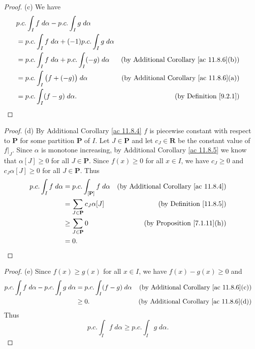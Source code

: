 \begin{proof}{(c)}
    We have
    \begin{align*}
         & p.c. \int_I f \; d \alpha - p.c. \int_I g \; d \alpha                                                              \\
         & = p.c. \int_I f \; d \alpha + (-1) p.c. \int_I g \; d \alpha                                                       \\
         & = p.c. \int_I f \; d \alpha + p.c. \int_I (-g) \; d \alpha   & \text{(by Additional Corollary \ref{ac 11.8.6}(b))} \\
         & = p.c. \int_I \big(f + (-g)\big) \; d \alpha                 & \text{(by Additional Corollary \ref{ac 11.8.6}(a))} \\
         & = p.c. \int_I (f - g) \; d \alpha.                           & \text{(by Definition \ref{9.2.1})}
    \end{align*}
\end{proof}

\begin{proof}{(d)}
    By Additional Corollary \ref{ac 11.8.4} \(f\) is piecewise constant with respect to \(\mathbf{P}\) for some partition \(\mathbf{P}\) of \(I\).
    Let \(J \in \mathbf{P}\) and let \(c_J \in \mathbf{R}\) be the constant value of \(f|_J\).
    Since \(\alpha\) is monotone increasing, by Additional Corollary \ref{ac 11.8.5} we know that \(\alpha[J] \geq 0\) for all \(J \in \mathbf{P}\).
    Since \(f(x) \geq 0\) for all \(x \in I\), we have \(c_J \geq 0\) and \(c_J \alpha[J] \geq 0\) for all \(J \in \mathbf{P}\).
    Thus
    \begin{align*}
        p.c. \int_I f \; d \alpha & = p.c. \int_{[\mathbf{P}]} f \; d \alpha & \text{(by Additional Corollary \ref{ac 11.8.4})} \\
                                  & = \sum_{J \in \mathbf{P}} c_J \alpha[J]  & \text{(by Definition \ref{11.8.5})}              \\
                                  & \geq \sum_{J \in \mathbf{P}} 0           & \text{(by Proposition \ref{7.1.11}(h))}          \\
                                  & = 0.
    \end{align*}
\end{proof}

\begin{proof}{(e)}
    Since \(f(x) \geq g(x)\) for all \(x \in I\), we have \(f(x) - g(x) \geq 0\) and
    \begin{align*}
        p.c. \int_I f \; d \alpha - p.c. \int_I g \; d \alpha & = p.c. \int_I (f - g) \; d \alpha & \text{(by Additional Corollary \ref{ac 11.8.6}(c))} \\
                                                              & \geq 0.                           & \text{(by Additional Corollary \ref{ac 11.8.6}(d))}
    \end{align*}
    Thus
    \[
        p.c. \int_I f \; d \alpha \geq p.c. \int_I g \; d \alpha.
    \]
\end{proof}

